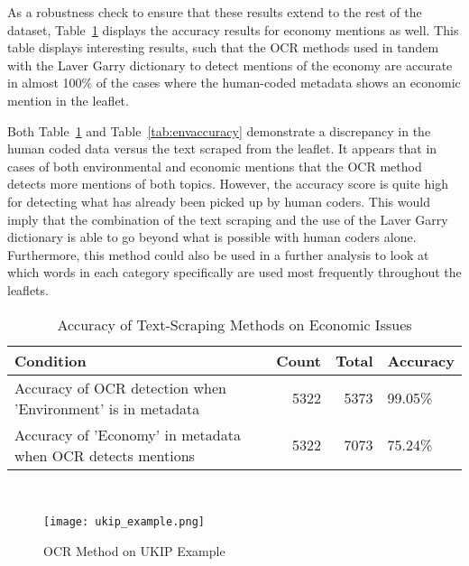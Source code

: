 \documentclass[12pt,letterpaper]{article}
\begin{document}
\vspace{0.5cm}

As a robustness check to ensure that these results extend to the rest of the dataset, Table~\ref{tab:econaccuracy} displays the accuracy results for economy mentions as well. This table displays interesting results, such that the OCR methods used in tandem with the Laver Garry dictionary \autocite{laverEstimatingPolicyPositions2000} to detect mentions of the economy are accurate in almost 100\% of the cases where the human-coded metadata shows an economic mention in the leaflet. 

Both Table~\ref{tab:econaccuracy} and Table~\ref{tab:envaccuracy} demonstrate a discrepancy in the human coded data versus the text scraped from the leaflet. It appears that in cases of both environmental and economic mentions that the OCR method detects more mentions of both topics. However, the accuracy score is quite high for detecting what has already been picked up by human coders. This would imply that the combination of the text scraping and the use of the Laver Garry dictionary is able to go beyond what is possible with human coders alone. Furthermore, this method could also be used in a further analysis to look at which words in each category specifically are used most frequently throughout the leaflets. 


\vspace{1cm}

\begin{table}[!htbp] 
	\centering 
	\captionsetup{justification=centering} %
	\caption{Accuracy of Text-Scraping Methods on Economic Issues} 
	\label{tab:econaccuracy} 
	\begin{tabular}{lrrl}
		\toprule
		Condition & Count & Total & Accuracy \\
		\midrule
		Accuracy of OCR detection when 'Environment' is in metadata & 5322 & 5373 & 99.05\% \\
		Accuracy of 'Economy' in metadata when OCR detects mentions & 5322 & 7073 & 75.24\% \\
		\bottomrule
	\end{tabular}\\
\end{table}


\vspace{1cm}





\begin{wrapfigure}[34]{l}{0.58\textwidth}
	\centering
	\texttt{[image: ukip\_example.png]}
	\caption{OCR Method on UKIP Example}
	\label{fig:ukip_example}
\end{wrapfigure}
\end{document}
